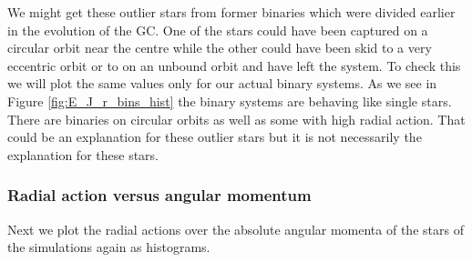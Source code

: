 \par We might get these outlier stars from former binaries which were divided earlier in the evolution of the \ac{GC}. One of the stars could have been captured on a circular orbit near the centre while the other could have been skid to a very eccentric orbit or to on an unbound orbit and have left the system. To check this we will plot the same values only for our actual binary systems. As we see in Figure \ref{fig:E_J_r_bins_hist} the binary systems are behaving like single stars. There are binaries on circular orbits as well as some with high radial action. That could be an explanation for these outlier stars but it is not necessarily the explanation for these stars.

\subsubsection{Radial action versus angular momentum}
\par Next we plot the radial actions over the absolute angular momenta of the stars of the simulations again as histograms. 
